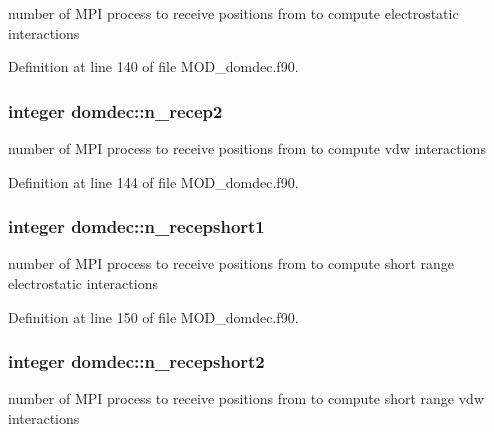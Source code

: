 number of M\-P\-I process to receive positions from to compute electrostatic interactions 



Definition at line 140 of file M\-O\-D\-\_\-domdec.\-f90.

\hypertarget{classdomdec_abe55b19e68b835314f58393f920e9272}{
\subsubsection[{n\-\_\-recep2}]{\setlength{\rightskip}{0pt plus 5cm}integer domdec\-::n\-\_\-recep2}}\label{classdomdec_abe55b19e68b835314f58393f920e9272}


number of M\-P\-I process to receive positions from to compute vdw interactions 



Definition at line 144 of file M\-O\-D\-\_\-domdec.\-f90.

\hypertarget{classdomdec_a88b84c15a29f8f4e25738fffb5027497}{
\subsubsection[{n\-\_\-recepshort1}]{\setlength{\rightskip}{0pt plus 5cm}integer domdec\-::n\-\_\-recepshort1}}\label{classdomdec_a88b84c15a29f8f4e25738fffb5027497}


number of M\-P\-I process to receive positions from to compute short range electrostatic interactions 



Definition at line 150 of file M\-O\-D\-\_\-domdec.\-f90.

\hypertarget{classdomdec_afdbf4a84ec151ba26b0b1112fc28b811}{
\subsubsection[{n\-\_\-recepshort2}]{\setlength{\rightskip}{0pt plus 5cm}integer domdec\-::n\-\_\-recepshort2}}\label{classdomdec_afdbf4a84ec151ba26b0b1112fc28b811}


number of M\-P\-I process to receive positions from to compute short range vdw interactions 




